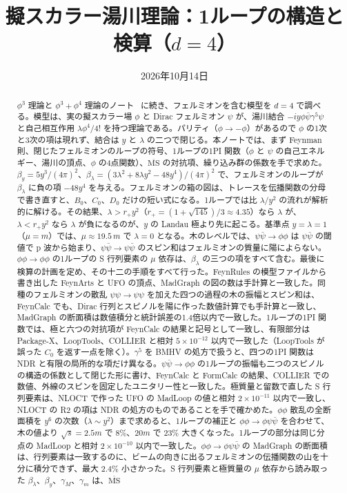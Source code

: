 \documentclass[a4paper,10pt]{ltjsarticle}
\title{擬スカラー湯川理論：1ループの構造と検算（$d=4$）}
\author{}
\date{2026年10月14日}
\newcommand{\MSbar}{\overline{\mathrm{MS}}}
\begin{document}
\maketitle

\begin{abstract}
$\phi^3$ 理論と $\phi^3+\phi^4$ 理論のノート~\cite{phi3note,phi34note} に続き、フェルミオンを含む模型を $d=4$ で調べる。模型は、実の擬スカラー場 $\phi$ と Dirac フェルミオン $\psi$ が、湯川結合 $-iy\phi\bar\psi\gamma^5\psi$ と自己相互作用 $\lambda\phi^4/4!$ を持つ理論である。パリティ（$\phi\to-\phi$）があるので $\phi$ の1次と3次の項は現れず、結合は $y$ と $\lambda$ の二つで閉じる。本ノートでは、まず Feynman 則、閉じたフェルミオンのループの符号、1ループの1PI 関数（$\phi$ と $\psi$ の自己エネルギー、湯川の頂点、$\phi$ の4点関数）、$\MSbar$ の対抗項、繰り込み群の係数を手で求めた。$\beta_y=5y^3/(4\pi)^2$、$\beta_\lambda=(3\lambda^2+8\lambda y^2-48y^4)/(4\pi)^2$ で、フェルミオンのループが $\beta_\lambda$ に負の項 $-48y^4$ を与える。フェルミオンの箱の図は、トレースを伝播関数の分母で書き直すと、$B_0$、$C_0$、$D_0$ だけの短い式になる。1ループでは比 $\lambda/y^2$ の流れが解析的に解ける。その結果、$\lambda>r_+y^2$（$r_+=(1+\sqrt{145})/3\approx4.35$）なら $\lambda$ が、$\lambda<r_+y^2$ なら $\lambda$ が負になるのが、$y$ の Landau 極より先に起こる。基準点 $y=\lambda=1$（$\mu=m$）では、$\mu\approx19.5\,m$ で $\lambda=0$ となる。木のレベルでは、$\psi\bar\psi\to\phi\phi$ は $\psi\bar\psi$ の閾値で p 波から始まり、$\psi\bar\psi\to\psi\bar\psi$ のスピン和はフェルミオンの質量に陽によらない。$\phi\phi\to\phi\phi$ の1ループの S 行列要素の $\mu$ 依存は、$\beta_\lambda$ の三つの項をすべて含む。最後に検算の計画を定め、その十二の手順をすべて行った。FeynRules の模型ファイルから書き出した FeynArts と UFO の頂点、MadGraph の図の数は手計算と一致した。同種のフェルミオンの散乱 $\psi\psi\to\psi\psi$ を加えた四つの過程の木の振幅とスピン和は、FeynCalc でも、Dirac 行列とスピノルを陽に作った数値計算でも手計算と一致し、MadGraph の断面積は数値積分と統計誤差の1.4倍以内で一致した。1ループの1PI 関数では、極と六つの対抗項が FeynCalc の結果と記号として一致し、有限部分は Package-X、LoopTools、COLLIER と相対 $5\times10^{-12}$ 以内で一致した（LoopTools が誤った $C_0$ を返す一点を除く）。$\gamma^5$ を BMHV の処方で扱うと、四つの1PI 関数は NDR と有限の局所的な項だけ異なる。$\psi\bar\psi\to\phi\phi$ の1ループの振幅も二つのスピノルの構造の係数として閉じた形に書け、FeynCalc と FormCalc の結果、COLLIER での数値、外線のスピンを固定したユニタリー性と一致した。極質量と留数で直した S 行列要素は、NLOCT で作った UFO の MadLoop の値と相対 $2\times10^{-11}$ 以内で一致し、NLOCT の R2 の項は NDR の処方のものであることを手で確かめた。$\phi\phi$ 散乱の全断面積を $y^6$ の次数（$\lambda\sim y^2$）まで求めると、1ループの補正と $\phi\phi\to\phi\psi\bar\psi$ を合わせて、木の値より $\sqrt s=2.5m$ で $8\%$、$20m$ で $23\%$ 大きくなった。1ループの部分は同じ分点の MadLoop と相対 $2\times10^{-10}$ 以内で一致した。$\phi\phi\to\phi\psi\bar\psi$ の MadGraph の断面積は、行列要素は一致するのに、ビームの向きに出るフェルミオンの伝播関数の山を十分に積分できず、最大 $2.4\%$ 小さかった。S 行列要素と極質量の $\mu$ 依存から読み取った $\beta_\lambda$、$\beta_y$、$\gamma_M$、$\gamma_m$ は、$\MSbar$ 
\end{abstract}
\end{document}

